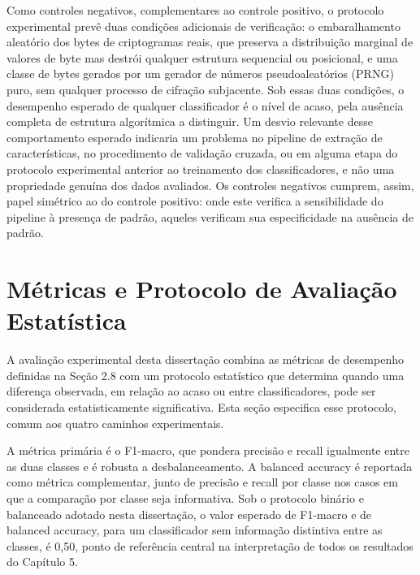 Como controles negativos, complementares ao controle positivo, o protocolo experimental prevê duas condições adicionais de verificação: o embaralhamento aleatório dos bytes de criptogramas reais, que preserva a distribuição marginal de valores de byte mas destrói qualquer estrutura sequencial ou posicional, e uma classe de bytes gerados por um gerador de números pseudoaleatórios (PRNG) puro, sem qualquer processo de cifração subjacente. Sob essas duas condições, o desempenho esperado de qualquer classificador é o nível de acaso, pela ausência completa de estrutura algorítmica a distinguir. Um desvio relevante desse comportamento esperado indicaria um problema no pipeline de extração de características, no procedimento de validação cruzada, ou em alguma etapa do protocolo experimental anterior ao treinamento dos classificadores, e não uma propriedade genuína dos dados avaliados. Os controles negativos cumprem, assim, papel simétrico ao do controle positivo: onde este verifica a sensibilidade do pipeline à presença de padrão, aqueles verificam sua especificidade na ausência de padrão.




\section{Métricas e Protocolo de Avaliação Estatística}
\label{sec:metricas-validacao}

A avaliação experimental desta dissertação combina as métricas de desempenho definidas na Seção 2.8 com um protocolo estatístico que determina quando uma diferença observada, em relação ao acaso ou entre classificadores, pode ser considerada estatisticamente significativa. Esta seção especifica esse protocolo, comum aos quatro caminhos experimentais.

A métrica primária é o F1-macro, que pondera precisão e recall igualmente entre as duas classes e é robusta a desbalanceamento. A balanced accuracy é reportada como métrica complementar, junto de precisão e recall por classe nos casos em que a comparação por classe seja informativa. Sob o protocolo binário e balanceado adotado nesta dissertação, o valor esperado de F1-macro e de balanced accuracy, para um classificador sem informação distintiva entre as classes, é 0,50, ponto de referência central na interpretação de todos os resultados do Capítulo 5.

